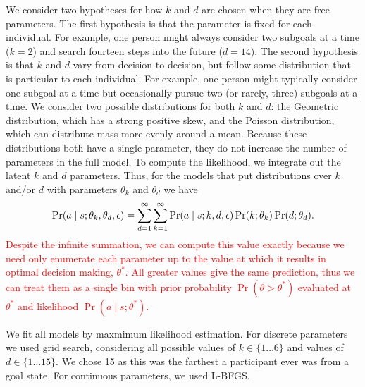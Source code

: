 \documentclass[10pt,letterpaper]{article}
\newcommand{\red}[1]{\textcolor{red}{#1}}
\begin{document}
We consider two hypotheses for how $k$ and $d$ are chosen when they are free parameters. The first hypothesis is that the parameter is fixed for each individual. For example, one person might always consider two subgoals at a time ($k=2$)  and search fourteen steps into the future ($d=14$). The second hypothesis is that $k$ and $d$ vary from decision to decision, but follow some distribution that is particular to each individual. For example, one person might typically consider one subgoal at a time but occasionally pursue two (or rarely, three) subgoals at a time. We consider two possible distributions for both $k$ and $d$: the Geometric distribution, which has a strong positive skew, and the Poisson distribution, which can distribute mass more evenly around a mean. Because these distributions both have a single parameter, they do not increase the number of parameters in the full model. To compute the likelihood, we integrate out the latent $k$ and $d$ parameters. Thus, for the models that put distributions over $k$ and/or $d$ with parameters $\theta_k$ and $\theta_d$ we have
%
%
\red{%
\begin{equation}\label{eq:likelihood-dist}
  \Pr(a \mid s; \theta_k, \theta_d, \epsilon) = 
    \sum_{d=1}^{\infty} \sum_{k=1}^{\infty}
      \Pr(a \mid s; k, d, \epsilon) \Pr(k ; \theta_k) \Pr(d ; \theta_d) \\
.
\end{equation}
Despite the infinite summation, we can compute this value exactly because we need only enumerate each parameter up to the value at which it results in optimal decision making, $\theta^*$. All greater values give the same prediction, thus we can treat them as a single bin with prior probability $\Pr(\theta > \theta^*)$ evaluated at $\theta^*$ and likelihood  $\Pr(a \mid s; \theta^*)$.
}

We fit all models by maxmimum likelihood estimation. For discrete parameters we used grid search, considering all possible values of $k \in \{ 1 \dots 6 \}$ and values of $d \in \{1 \dots 15 \}$. We chose 15 as this was the farthest a participant ever was from a goal state. For continuous parameters, we used L-BFGS.
\end{document}
